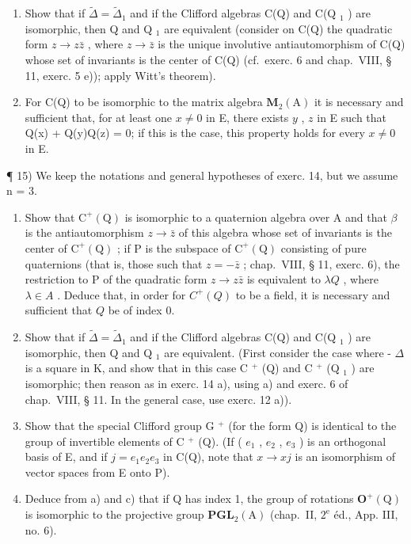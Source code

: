 \begin{enumerate}
\def\labelenumi{\alph{enumi})}
\item
  Show that if \(\tilde{\Delta} = \tilde{\Delta}_{1}\) and if the Clifford algebras C(Q) and C(Q \(_{1}\) ) are isomorphic, then Q and Q \(_{1}\) are equivalent (consider on C(Q) the quadratic form \(z \to z\bar{z}\) , where \(z \to \bar{z}\) is the unique involutive antiautomorphism of C(Q) whose set of invariants is the center of C(Q) (cf.~exerc. 6 and chap.~VIII, § 11, exerc. 5 e)); apply Witt's theorem).
\item
  For C(Q) to be isomorphic to the matrix algebra \(\mathbf{M}_{2}(\mathrm{A})\) it is necessary and sufficient that, for at least one \(x \neq 0\) in E, there exists \(y\) , \(z\) in E such that Q(x) + Q(y)Q(z) = 0; if this is the case, this property holds for every \(x \neq 0\) in E.
\end{enumerate}

¶ 15) We keep the notations and general hypotheses of exerc. 14, but we assume n = 3.

\begin{enumerate}
\def\labelenumi{\alph{enumi})}
\item
  Show that \(\mathrm{C}^{+}(\mathrm{Q})\) is isomorphic to a quaternion algebra over A and that \(\beta\) is the antiautomorphism \(z\to \bar{z}\) of this algebra whose set of invariants is the center of \(\mathrm{C}^{+}(\mathrm{Q})\) ; if P is the subspace of \(\mathrm{C}^{+}(\mathrm{Q})\) consisting of pure quaternions (that is, those such that \(z = -\bar{z}\) ; chap.~VIII, § 11, exerc. 6), the restriction to P of the quadratic form \(z\to z\bar{z}\) is equivalent to \(\lambda Q\) , where \(\lambda \in A\) . Deduce that, in order for \(C^{+}(Q)\) to be a field, it is necessary and sufficient that \(Q\) be of index 0.
\item
  Show that if \(\tilde{\Delta} = \tilde{\Delta}_{1}\) and if the Clifford algebras C(Q) and C(Q \(_{1}\) ) are isomorphic, then Q and Q \(_{1}\) are equivalent. (First consider the case where - \(\Delta\) is a square in K, and show that in this case C \(^{+}\) (Q) and C \(^{+}\) (Q \(_{1}\) ) are isomorphic; then reason as in exerc. 14 a), using a) and exerc. 6 of chap.~VIII, § 11. In the general case, use exerc. 12 a)).
\item
  Show that the special Clifford group G \(^{+}\) (for the form Q) is identical to the group of invertible elements of C \(^{+}\) (Q). (If ( \(e_{1}\) , \(e_{2}\) , \(e_{3}\) ) is an orthogonal basis of E, and if \(j = e_{1}e_{2}e_{3}\) in C(Q), note that \(x \to xj\) is an isomorphism of vector spaces from E onto P).
\item
  Deduce from a) and c) that if Q has index 1, the group of rotations \(\mathbf{O}^{+}(\mathrm{Q})\) is isomorphic to the projective group \(\mathbf{PGL}_{2}(\mathrm{A})\) (chap.~II, \(2^{\mathrm{e}}\) éd., App. III, no. 6).
\end{enumerate}

